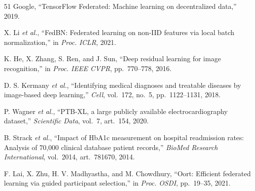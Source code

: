 \documentclass[conference,a4paper]{IEEEtran}
\begin{document}
\begin{thebibliography}{51}
Google, ``TensorFlow Federated: Machine learning on decentralized data,'' 2019.

X. Li \textit{et al.}, ``FedBN: Federated learning on non-IID features via local batch normalization,'' in \textit{Proc. ICLR}, 2021.

K. He, X. Zhang, S. Ren, and J. Sun, ``Deep residual learning for image recognition,'' in \textit{Proc. IEEE CVPR}, pp.~770--778, 2016.

D. S. Kermany \textit{et al.}, ``Identifying medical diagnoses and treatable diseases by image-based deep learning,'' \textit{Cell}, vol.~172, no.~5, pp.~1122--1131, 2018.

P. Wagner \textit{et al.}, ``PTB-XL, a large publicly available electrocardiography dataset,'' \textit{Scientific Data}, vol.~7, art.~154, 2020.

B. Strack \textit{et al.}, ``Impact of HbA1c measurement on hospital readmission rates: Analysis of 70,000 clinical database patient records,'' \textit{BioMed Research International}, vol.~2014, art.~781670, 2014.

F. Lai, X. Zhu, H. V. Madhyastha, and M. Chowdhury, ``Oort: Efficient federated learning via guided participant selection,'' in \textit{Proc. OSDI}, pp.~19--35, 2021.


\end{thebibliography}
\end{document}
